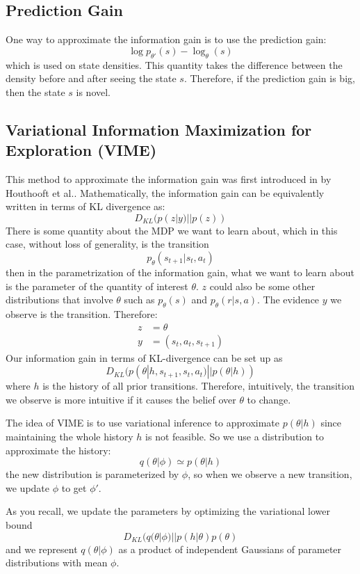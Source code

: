 \subsection{Prediction Gain}
One way to approximate the information gain is to use the prediction gain:
\[
\log p_{\theta'}(s) - \log_\theta(s)
\]
which is used on state densities. This quantity takes the difference between the density before and after seeing the state $s$. Therefore, if the prediction gain is big, then the state $s$ is novel.
\subsection{Variational Information Maximization for Exploration (VIME)}
This method to approximate the information gain was first introduced in \cite{houthooft2016vime} by Houthooft et al.. Mathematically, the information gain can be equivalently written in terms of KL divergence as:
\[
D_{KL}(p(z|y)||p(z))
\]
There is some quantity about the MDP we want to learn about, which in this case, without loss of generality, is the transition
\[
p_\theta(s_{t+1}|s_t,a_t)
\]
then in the parametrization of the information gain, what we want to learn about is the parameter of the quantity of interest $\theta$. $z$ could also be some other distributions that involve $\theta$ such as $p_\theta(s)$ and $p_\theta(r|s,a)$. The evidence $y$ we observe is the transition. Therefore:
\begin{align*}
    z &= \theta\\
    y &= (s_t,a_t,s_{t+1})
\end{align*}
Our information gain in terms of KL-divergence can be set up as
\[
D_{KL}(p(\theta|h,s_{t+1},s_t,a_t)||p(\theta|h))
\]
where $h$ is the history of all prior transitions. Therefore, intuitively, the transition we observe is more intuitive if it causes the belief over $\theta$ to change.

The idea of VIME is to use variational inference to approximate $p(\theta|h)$ since maintaining the whole history $h$ is not feasible. So we use a distribution to approximate the history:
\[
q(\theta|\phi) \simeq p(\theta|h)
\]
the new distribution is parameterized by $\phi$, so when we observe a new transition, we update $\phi$ to get $\phi'$.

As you recall, we update the parameters by optimizing the variational lower bound
\[
D_{KL}(q(\theta|\phi)||p(h|\theta)p(\theta)
\]
and we represent $q(\theta|\phi)$ as a product of independent Gaussians of parameter distributions with mean $\phi$. 

